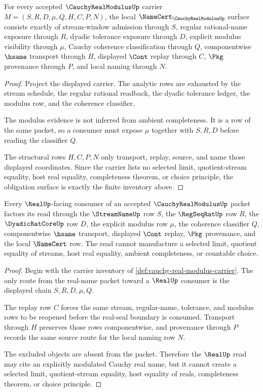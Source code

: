 \begin{theorem}
\label{thm:cauchy-real-modulus-obligation-surface}
For every accepted $\CauchyRealModulusUp$ carrier $M=(S,R,D,\mu,Q,H,C,P,N)$, the local $\NameCert_{\CauchyRealModulusUp}$ surface consists exactly of stream-window admission through $S$, regular rational-name exposure through $R$, dyadic tolerance exposure through $D$, explicit modulus visibility through $\mu$, Cauchy coherence classification through $Q$, componentwise $\hsame$ transport through $H$, displayed $\Cont$ replay through $C$, $\Pkg$ provenance through $P$, and local naming through $N$.
\end{theorem}
\begin{proof}
Project the displayed carrier. The analytic rows are exhausted by the stream schedule, the regular rational readback, the dyadic tolerance ledger, the modulus row, and the coherence classifier.

The modulus evidence is not inferred from ambient completeness. It is a row of the same packet, so a consumer must expose $\mu$ together with $S,R,D$ before reading the classifier $Q$.

The structural rows $H,C,P,N$ only transport, replay, source, and name those displayed coordinates. Since the carrier lists no selected limit, quotient-stream equality, host real equality, completeness theorem, or choice principle, the obligation surface is exactly the finite inventory above.
\end{proof}

\begin{theorem}
\label{thm:cauchy-real-modulus-real-seal-nonescape}
Every $\RealUp$-facing consumer of an accepted $\CauchyRealModulusUp$ packet factors its read through the $\StreamNameUp$ row $S$, the $\RegSeqRatUp$ row $R$, the $\DyadicRatCoreUp$ row $D$, the explicit modulus row $\mu$, the coherence classifier $Q$, componentwise $\hsame$ transport, displayed $\Cont$ replay, $\Pkg$ provenance, and the local $\NameCert$ row. The read cannot manufacture a selected limit, quotient equality of streams, host real equality, ambient completeness, or countable choice.
\end{theorem}
\begin{proof}
Begin with the carrier inventory of \autoref{def:cauchy-real-modulus-carrier}. The only route from the real-name packet toward a $\RealUp$ consumer is the displayed chain $S,R,D,\mu,Q$.

The replay row $C$ forces the same stream, regular-name, tolerance, and modulus rows to be reopened before the real-seal boundary is consumed. Transport through $H$ preserves those rows componentwise, and provenance through $P$ records the same source route for the local naming row $N$.

The excluded objects are absent from the packet. Therefore the $\RealUp$ read may cite an explicitly modulated Cauchy real name, but it cannot create a selected limit, quotient-stream equality, host equality of reals, completeness theorem, or choice principle.
\end{proof}


